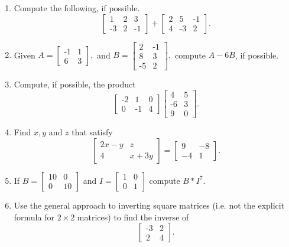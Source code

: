 \documentclass[11pt]{article} %
\begin{document}
\begin{enumerate}
\item Compute the following, if possible. 
$$\begin{bmatrix}
1 & 2 & 3 \\
\text{-}3 & 2 & \text{-}1
\end{bmatrix}
+ 
\begin{bmatrix}
2 & 5 & \text{-}1\\
4 & \text{-}3 & 2
\end{bmatrix}.
$$
\item Given $A = \begin{bmatrix}
\text{-}1 & 1 \\
6 & 3
\end{bmatrix},$ and $B = \begin{bmatrix}
2 & \text{-}1 \\
8 & 3 \\
\text{-}5 & 2
\end{bmatrix}, $ compute $A - 6B$, if possible.
\item Compute, if possible, the product 
$$\begin{bmatrix}
\text{-}2 & 1 & 0\\
0 & \text{-}1 & 4 
\end{bmatrix}\begin{bmatrix}
4 & 5 \\
\text{-}6 & 3 \\
9 & 0
\end{bmatrix}.$$
\item Find $x,y$ and $z$ that satisfy 
$$\begin{bmatrix}
	2x - y & z \\
	4 & x + 3y
\end{bmatrix}
= 
\begin{bmatrix}
	9 & -8 \\
	-4 & 1
\end{bmatrix}.
$$
\item If $B = \begin{bmatrix} 
10 & 0 \\
0 & 10
\end{bmatrix}$ and $I=\begin{bmatrix} 
1 & 0 \\
0 & 1
\end{bmatrix}$
compute $B*I^{7}.$

\item Use the general approach to inverting square matrices (i.e. not the explicit formula for $2\times2$ matrices) to find the inverse of $$\begin{bmatrix} \text{-}3 & 2 \\ 2 & 4\end{bmatrix}.$$


\end{enumerate}
\end{document}

